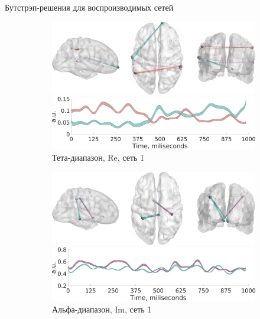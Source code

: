\documentclass[12pt]{beamer}
\begin{document}
\begin{frame}[t]{Бутстрэп-решения для воспроизводимых сетей}
    \begin{figure}
    \centering

     \begin{subfigure}[b]{0.47\textwidth}
     \includegraphics[width=\textwidth]{../images/psiicos_paper/Figure11_a1.jpg}
     \includegraphics[width=\textwidth]{../images/psiicos_paper/Figure11_a2.jpg}
     {\small Тета-диапазон, Re, сеть 1}\label{fig:11a}
     \end{subfigure}
     \hspace{0.2cm}
     \begin{subfigure}[b]{0.47\textwidth}
     \includegraphics[width=\textwidth]{../images/psiicos_paper/Figure11_b1.jpg}
     \includegraphics[width=\textwidth]{../images/psiicos_paper/Figure11_b2.jpg}
     {\small Альфа-диапазон, Im, сеть 1}\label{fig:11b}
     \end{subfigure}
    \end{figure} %
\end{frame}
\end{document}
